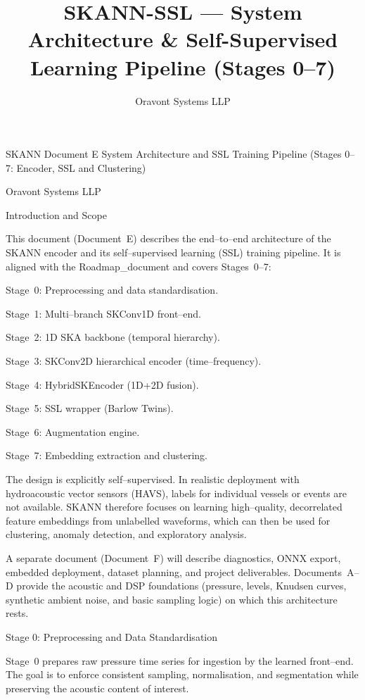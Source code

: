 \documentclass[12pt]{article}
\begin{document}
\title{SKANN-SSL --- System Architecture \& Self-Supervised Learning Pipeline (Stages 0--7)}
\author{Oravont Systems LLP}
\date{}
\maketitle

SKANN Document E
System Architecture and SSL Training Pipeline
(Stages 0–7: Encoder, SSL and Clustering)

Oravont Systems LLP

Introduction and Scope

This document (Document E) describes the end–to–end architecture of the SKANN encoder and its self–supervised learning (SSL) training pipeline. It is aligned with the Roadmap_document and covers Stages 0–7:

Stage 0: Preprocessing and data standardisation.

Stage 1: Multi–branch SKConv1D front–end.

Stage 2: 1D SKA backbone (temporal hierarchy).

Stage 3: SKConv2D hierarchical encoder (time–frequency).

Stage 4: HybridSKEncoder (1D+2D fusion).

Stage 5: SSL wrapper (Barlow Twins).

Stage 6: Augmentation engine.

Stage 7: Embedding extraction and clustering.

The design is explicitly self–supervised. In realistic deployment with hydroacoustic vector sensors (HAVS), labels for individual vessels or events are not available. SKANN therefore focuses on learning high–quality, decorrelated feature embeddings from unlabelled waveforms, which can then be used for clustering, anomaly detection, and exploratory analysis.

A separate document (Document F) will describe diagnostics, ONNX export, embedded deployment, dataset planning, and project deliverables. Documents A–D provide the acoustic and DSP foundations (pressure, levels, Knudsen curves, synthetic ambient noise, and basic sampling logic) on which this architecture rests.

Stage 0: Preprocessing and Data Standardisation

Stage 0 prepares raw pressure time series for ingestion by the learned front–end. The goal is to enforce consistent sampling, normalisation, and segmentation while preserving the acoustic content of interest.
\end{document}
